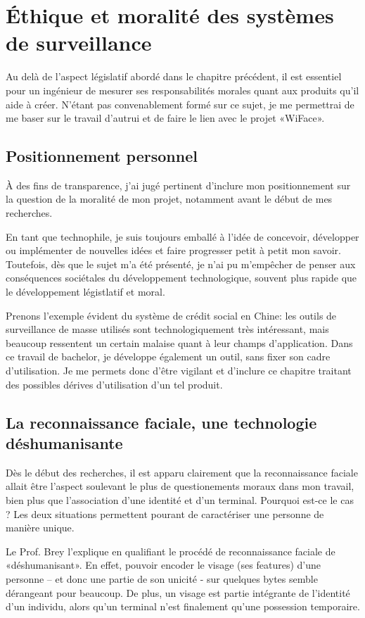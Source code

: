 \chapter{Éthique et moralité des systèmes de surveillance}
\label{ch:etudemoralite}

Au delà de l’aspect législatif abordé dans le chapitre précédent, il est essentiel pour un ingénieur de mesurer ses
responsabilités morales quant aux produits qu’il aide à créer. N’étant pas convenablement formé sur ce sujet, je
me permettrai de me baser sur le travail d’autrui et de faire le lien avec le projet «WiFace».

\section{Positionnement personnel}
À des fins de transparence, j'ai jugé pertinent d'inclure mon positionnement sur la question de la moralité de mon projet,
notamment avant le début de mes recherches.

En tant que technophile, je suis toujours emballé à l'idée de concevoir, développer ou implémenter de nouvelles idées et faire progresser petit à
petit mon savoir. 
Toutefois, dès que le sujet m'a été présenté, je n'ai pu m'empêcher de penser aux conséquences sociétales du développement technologique, 
souvent plus rapide que le développement légistlatif et moral.

Prenons l'exemple évident du système de crédit social en Chine: les outils de surveillance de masse utilisés sont technologiquement très intéressant, mais
beaucoup ressentent un certain malaise quant à leur champs d'application. Dans ce travail de bachelor, je développe également un outil, sans fixer son cadre d'utilisation.
Je me permets donc d'être vigilant et d'inclure ce chapitre traitant des possibles dérives d'utilisation d'un tel produit. 

\section{La reconnaissance faciale, une technologie déshumanisante}
Dès le début des recherches, il est apparu clairement que la reconnaissance faciale allait être l’aspect soulevant le
plus de questionements moraux dans mon travail, bien plus que l’association d’une identité et d’un terminal.
Pourquoi est-ce le cas ? Les deux situations permettent pourant de caractériser une personne de manière unique.

Le Prof. Brey l’explique en qualifiant le procédé de reconnaissance faciale de «déshumanisant». En effet, pouvoir
encoder le visage (ses features) d’une personne – et donc une partie de son unicité - sur quelques bytes semble
dérangeant pour beaucoup. De plus, un visage est partie intégrante de l’identité d’un individu, alors qu’un terminal
n’est finalement qu’une possession temporaire.


